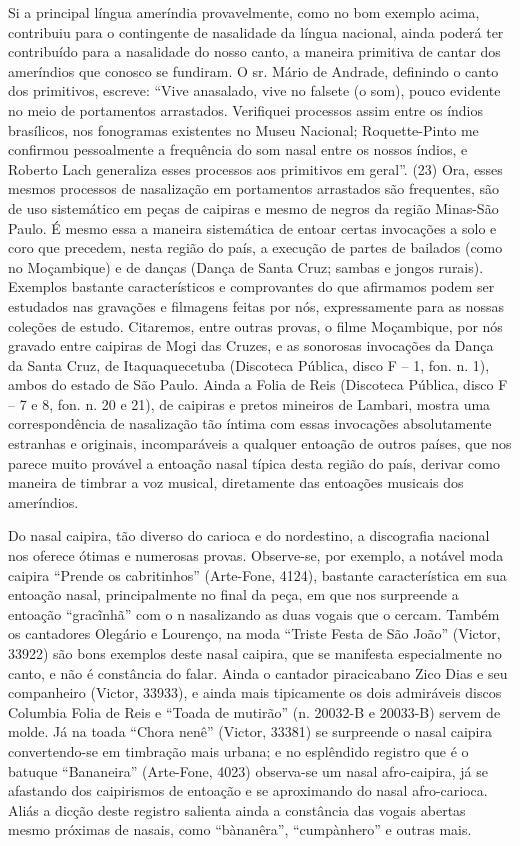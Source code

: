 Si a principal língua ameríndia provavelmente, como no bom exemplo
acima, contribuiu para o contingente de nasalidade da língua nacional,
ainda poderá ter contribuído para a nasalidade do nosso canto, a maneira
primitiva de cantar dos ameríndios que conosco se fundiram. O sr. Mário
de Andrade, definindo o canto dos primitivos, escreve: ``Vive anasalado,
vive no falsete (o som), pouco evidente no meio de portamentos
arrastados. Verifiquei processos assim entre os índios brasílicos, nos
fonogramas existentes no Museu Nacional; Roquette-Pinto me confirmou
pessoalmente a frequência do som nasal entre os nossos índios, e Roberto
Lach generaliza esses processos aos primitivos em geral''. (23) Ora,
esses mesmos processos de nasalização em portamentos arrastados são
frequentes, são de uso sistemático em peças de caipiras e mesmo de
negros da região Minas-São Paulo. É mesmo essa a maneira sistemática de
entoar certas invocações a solo e coro que precedem, nesta região do
país, a execução de partes de bailados (como no Moçambique) e de danças
(Dança de Santa Cruz; sambas e jongos rurais). Exemplos bastante
característicos e comprovantes do que afirmamos podem ser estudados nas
gravações e filmagens feitas por nós, expressamente para as nossas
coleções de estudo. Citaremos, entre outras provas, o filme Moçambique,
por nós gravado entre caipiras de Mogi das Cruzes, e as sonorosas
invocações da Dança da Santa Cruz, de Itaquaquecetuba (Discoteca
Pública, disco F -- 1, fon. n. 1), ambos do estado de São Paulo. Ainda a
Folia de Reis (Discoteca Pública, disco F -- 7 e 8, fon. n. 20 e 21), de
caipiras e pretos mineiros de Lambari, mostra uma correspondência de
nasalização tão íntima com essas invocações absolutamente estranhas e
originais, incomparáveis a qualquer entoação de outros países, que nos
parece muito provável a entoação nasal típica desta região do país,
derivar como maneira de timbrar a voz musical, diretamente das entoações
musicais dos ameríndios.

Do nasal caipira, tão diverso do carioca e do nordestino, a discografia
nacional nos oferece ótimas e numerosas provas. Observe-se, por exemplo,
a notável moda caipira ``Prende os cabritinhos'' (Arte-Fone, 4124),
bastante característica em sua entoação nasal, principalmente no final
da peça, em que nos surpreende a entoação ``gracĩnhã'' com o n
nasalizando as duas vogais que o cercam. Também os cantadores Olegário e
Lourenço, na moda ``Triste Festa de São João'' (Victor, 33922) são bons
exemplos deste nasal caipira, que se manifesta especialmente no canto, e
não é constância do falar. Ainda o cantador piracicabano Zico Dias e seu
companheiro (Victor, 33933), e ainda mais tipicamente os dois admiráveis
discos Columbia Folia de Reis e ``Toada de mutirão'' (n. 20032-B e
20033-B) servem de molde. Já na toada ``Chora nenê'' (Victor, 33381) se
surpreende o nasal caipira convertendo-se em timbração mais urbana; e no
esplêndido registro que é o batuque ``Bananeira'' (Arte-Fone, 4023)
observa-se um nasal afro-caipira, já se afastando dos caipirismos de
entoação e se aproximando do nasal afro-carioca. Aliás a dicção deste
registro salienta ainda a constância das vogais abertas mesmo próximas
de nasais, como ``bànanêra'', ``cumpànhero'' e outras mais.

